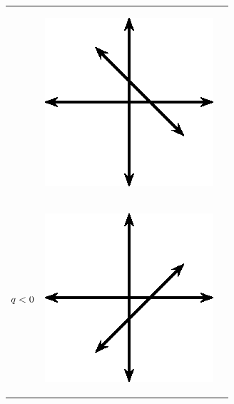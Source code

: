 \begin{table}[H]
\begin{center}
\begin{xtabular*}{\mytablewidth}[t]{|p{10\mystarwidth}|p{10\mystarwidth}|p{10\mystarwidth}|}
\begin{center}
    \vspace{.1in}
    \end{center}    
                 &
    \setcounter{subfigure}{0}
\label{m39338*id238315}
    \begin{center}
    \label{m39338*id238315!!!underscore!!!media}\label{m39338*id238315!!!underscore!!!printimage}\includegraphics[width=.3\columnwidth]{col11306.imgs/m39338_MG10C11_007.png} %
      \vspace{2pt}
    \vspace{.1in}
    \end{center}    
     \tabularnewline{}
                  $q<{}0$
                 &
    \setcounter{subfigure}{0}
\label{m39338*id238353}
    \begin{center}
    \label{m39338*id238353!!!underscore!!!media}\label{m39338*id238353!!!underscore!!!printimage}\includegraphics[width=.3\columnwidth]{col11306.imgs/m39338_MG10C11_008.png} %
      \vspace{2pt}

\end{center}
\end{xtabular*}
\end{center}
\end{table}

